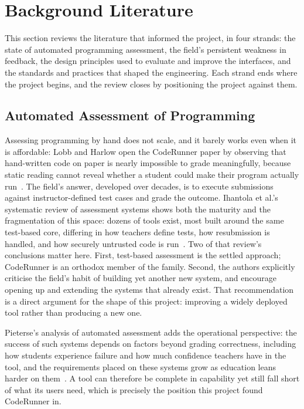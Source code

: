 \section{Background Literature}\label{backg}

This section reviews the literature that informed the project, in four strands: the state of automated programming assessment, the field's persistent weakness in feedback, the design principles used to evaluate and improve the interfaces, and the standards and practices that shaped the engineering. Each strand ends where the project begins, and the review closes by positioning the project against them.

\subsection{Automated Assessment of Programming}

Assessing programming by hand does not scale, and it barely works even when it is affordable: Lobb and Harlow open the CodeRunner paper by observing that hand-written code on paper is nearly impossible to grade meaningfully, because static reading cannot reveal whether a student could make their program actually run~\cite{CodeRunner2016}. The field's answer, developed over decades, is to execute submissions against instructor-defined test cases and grade the outcome. Ihantola et al.'s systematic review of assessment systems shows both the maturity and the fragmentation of this space: dozens of tools exist, most built around the same test-based core, differing in how teachers define tests, how resubmission is handled, and how securely untrusted code is run~\cite{reviewrecentsystems2010}. Two of that review's conclusions matter here. First, test-based assessment is the settled approach; CodeRunner is an orthodox member of the family. Second, the authors explicitly criticise the field's habit of building yet another new system, and encourage opening up and extending the systems that already exist. That recommendation is a direct argument for the shape of this project: improving a widely deployed tool rather than producing a new one.

Pieterse's analysis of automated assessment adds the operational perspective: the success of such systems depends on factors beyond grading correctness, including how students experience failure and how much confidence teachers have in the tool, and the requirements placed on these systems grow as education leans harder on them~\cite{pieterse2013automated}. A tool can therefore be complete in capability yet still fall short of what its users need, which is precisely the position this project found CodeRunner in.


